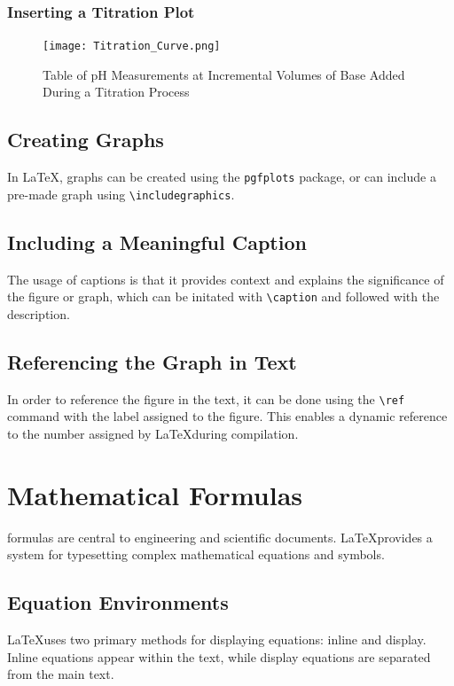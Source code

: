 \documentclass[12pt,journal,compsoc]{IEEEtran}
\begin{document}
\subsubsection{Inserting a Titration Plot}
\begin{figure}[htbp]
  \centering
  \texttt{[image: Titration\_Curve.png]}
  \caption{Table of pH Measurements at Incremental Volumes of Base Added During a Titration Process}
  \label{fig:titrationplot}
\end{figure}

\subsection{Creating Graphs}
In \LaTeX, graphs can be created using the \texttt{pgfplots} package, or can include a pre-made graph using \texttt{\textbackslash includegraphics}.

\subsection{Including a Meaningful Caption}
The usage of captions is that it provides context and explains the significance of the figure or graph, which can be initated with \texttt{\textbackslash caption} and followed with the description.

\subsection{Referencing the Graph in Text}
In order to reference the figure in the text, it can be done using the \texttt{\textbackslash ref} command with the label assigned to the figure. This enables a dynamic reference to the number assigned by \LaTeX during compilation.

\section{Mathematical Formulas}

 formulas are central to engineering and scientific documents. \LaTeX provides a system for typesetting complex mathematical equations and symbols.  

\subsection{Equation Environments}
\LaTeX uses two primary methods for displaying equations: inline and display. Inline equations appear within the text, while display equations are separated from the main text.
\end{document}
